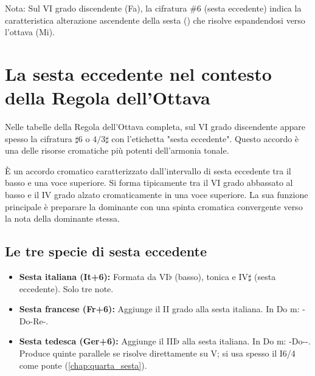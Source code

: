 \begin{esempio}
	\label{ex:regola_completa_disc_min}
	Nota: Sul VI grado discendente (Fa), la cifratura \#6 (sesta eccedente) indica la caratteristica alterazione ascendente della sesta (\Rediesis ) che risolve espandendosi verso l'ottava (Mi).
\end{esempio}

\section{La sesta eccedente nel contesto della Regola dell'Ottava}
\label{sec:sesta_eccedente}

Nelle tabelle della Regola dell'Ottava completa, sul VI grado discendente appare spesso la cifratura $\sharp 6$ o $4/3\sharp$ con l'etichetta "sesta eccedente". Questo accordo è una delle risorse cromatiche più potenti dell'armonia tonale.

\begin{definizione}
    \label{def:sesta_eccedente}
    È un accordo cromatico caratterizzato dall'intervallo di sesta eccedente tra il basso e una voce superiore. Si forma tipicamente tra il VI grado abbassato al basso e il IV grado alzato cromaticamente in una voce superiore.
    La sua funzione principale è preparare la dominante con una spinta cromatica convergente verso la nota della dominante stessa.
\end{definizione}

\subsection{Le tre specie di sesta eccedente}

\begin{itemize}
    \item \textbf{Sesta italiana (It+6):} Formata da VI$\flat$ (basso), tonica e IV$\sharp$ (sesta eccedente). Solo tre note.
    \item \textbf{Sesta francese (Fr+6):} Aggiunge il II grado alla sesta italiana. In Do m: \Labemolle -Do-Re-\Fadiesis .
    \item \textbf{Sesta tedesca (Ger+6):} Aggiunge il III$\flat$ alla sesta italiana. In Do m: \Labemolle -Do-\Mibemolle -\Fadiesis . Produce quinte parallele se risolve direttamente su V; si usa spesso il I6/4 come ponte (\ref{chap:quarta_sesta}).
\end{itemize}

